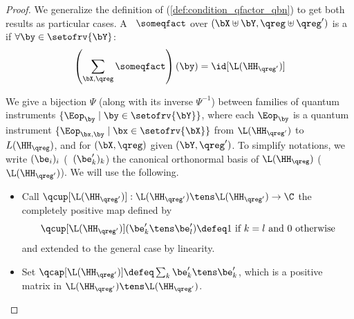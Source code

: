 \begin{proof}
We generalize the definition of \qCPTs (\cref{def:condition_qfactor_qbn}) to get both results as particular cases.
A \qfactor\ $\someqfact$ over $(\bX\uplus\bY,\qreg\uplus\qreg')$ is a  if $\forall \by\in\setofrv{\bY}$:
\begin{equation*}
\left(\sum_{\bX,\qreg} \someqfact\right)(\by)
=
\id[\L(\HH_{\qreg'})]
\end{equation*}

We give a bijection $\Psi$ (along with its inverse $\Psi^{-1}$) between families of quantum instruments $\{\Eop_\by \mid \by\in\setofrv{\bY}\}$, where each $\Eop_\by$ is a quantum instrument $\{\Eop_{\bx,\by} \mid \bx\in\setofrv{\bX}\}$ from $\L(\HH_{\qreg'})$ to $L(\HH_\qreg)$, and \qCPTs for $(\bX,\qreg)$ given $(\bY, \qreg')$.
To simplify notations, we write $(\be_i)_{i}$ (\resp\ $(\be'_k)_{k}$) the canonical orthonormal basis of $\L(\HH_{\qreg})$ (\resp\ $\L(\HH_{\qreg'})$).
We will use the following.
\begin{itemize}
\item
Call $\qcup[\L(\HH_{\qreg'})]:\L(\HH_{\qreg'})\tens\L(\HH_{\qreg'})\to\C$ the completely positive map defined by
\begin{equation*}
\qcup[\L(\HH_{\qreg'})](\be'_k \tens \be'_l) \defeq 1 \text{ if } k=l \text{ and } 0 \text{ otherwise}
\end{equation*}
and extended to the general case by linearity.
\item
Set $\qcap[\L(\HH_{\qreg'})]\defeq \sum_k \be'_k\tens \be'_k$, which is a positive matrix in $\L(\HH_{\qreg'})\tens\L(\HH_{\qreg'})$.
\end{itemize}


\end{proof}
